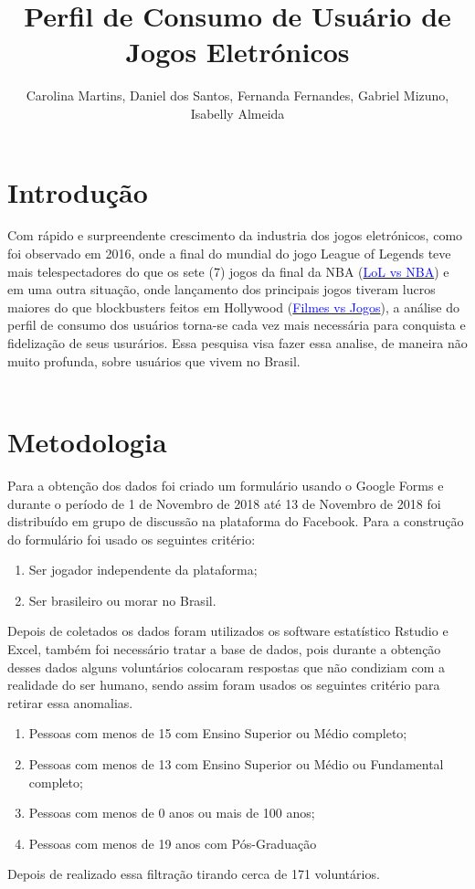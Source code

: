 \documentclass[11pt,a4paper]{article}
\title{Perfil de Consumo de Usuário de Jogos Eletrónicos}
\author{Carolina Martins, Daniel dos Santos, Fernanda Fernandes, Gabriel Mizuno, Isabelly  Almeida}
\date{ }
\begin{document}
 
\maketitle
 
\tableofcontents
 
\section{Introdução}

Com rápido e surpreendente crescimento da industria dos jogos eletrónicos, como foi observado em 2016, onde a final do mundial do jogo League of Legends teve mais telespectadores do que os sete (7) jogos da final da NBA (\href{https://bit.ly/2Dvdtw9}{\textcolor{blue}{LoL vs NBA}}) e em uma outra situação, onde lançamento dos principais jogos tiveram lucros maiores do que blockbusters feitos em Hollywood  (\href{https://bit.ly/2FfWHTk}{\textcolor{blue}{Filmes vs Jogos}}), a análise do perfil de consumo dos usuários torna-se cada vez mais necessária para conquista e fidelização de seus usurários. Essa pesquisa visa fazer essa analise, de maneira não muito profunda, sobre usuários que vivem no Brasil. 
\\ 
\\
 
\section{Metodologia}

Para a obtenção dos dados foi criado um formulário usando o Google Forms  e durante o período de 1 de Novembro de 2018 até 13 de Novembro de 2018 foi distribuído em grupo de discussão na plataforma do Facebook. Para a construção do formulário foi usado os seguintes critério:

\begin{enumerate}[label=(\roman*)]
\item Ser jogador independente da plataforma;
\item Ser brasileiro ou morar no Brasil.
\end{enumerate}

Depois de coletados os dados foram utilizados os software estatístico Rstudio e Excel, também foi necessário tratar a base de dados, pois durante a obtenção desses dados alguns voluntários colocaram respostas que não condiziam com a realidade do ser humano, sendo assim foram usados os seguintes critério para retirar essa anomalias.
 \begin{enumerate}[label=(\roman*)]
\item Pessoas com menos de 15 com Ensino Superior ou Médio completo; 
\item Pessoas com menos de 13 com  Ensino Superior ou Médio  ou Fundamental completo;
\item Pessoas com menos de 0 anos ou mais de 100 anos;
\item Pessoas com menos de 19 anos com Pós-Graduação
\end{enumerate}
Depois de realizado essa filtração tirando cerca de 171 voluntários.
\\
\end{document}
